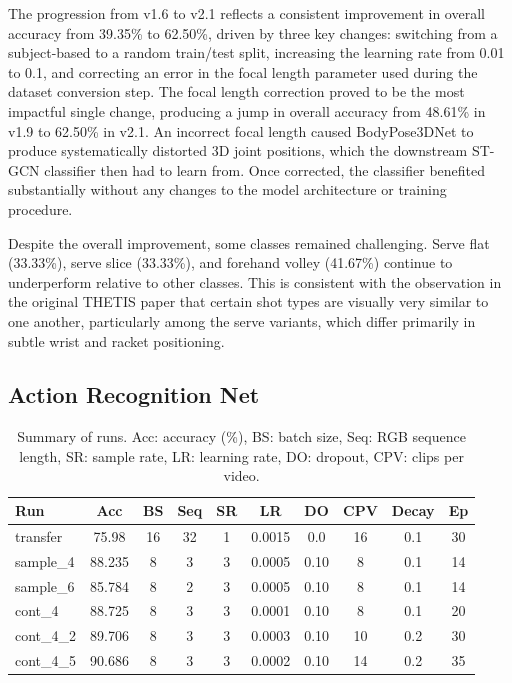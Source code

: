 \documentclass[pdflatex,sn-mathphys-num]{sn-jnl}%
\theoremstyle{thmstyleone}%
\theoremstyle{thmstyletwo}%
\theoremstyle{thmstylethree}%
\begin{document}
The progression from v1.6 to v2.1 reflects a consistent improvement in overall accuracy from 39.35\% to 62.50\%, driven by three key changes: switching from a subject-based to a random train/test split, increasing the learning rate from 0.01 to 0.1, and correcting an error in the focal length parameter used during the dataset conversion step. The focal length correction proved to be the most impactful single change, producing a jump in overall accuracy from 48.61\% in v1.9 to 62.50\% in v2.1. An incorrect focal length caused BodyPose3DNet to produce systematically distorted 3D joint positions, which the downstream ST-GCN classifier then had to learn from. Once corrected, the classifier benefited substantially without any changes to the model architecture or training procedure.

Despite the overall improvement, some classes remained challenging. Serve flat (33.33\%), serve slice (33.33\%), and forehand volley (41.67\%) continue to underperform relative to other classes. This is consistent with the observation in the original THETIS paper \cite{thetis} that certain shot types are visually very similar to one another, particularly among the serve variants, which differ primarily in subtle wrist and racket positioning.

\subsection{Action Recognition Net}\label{subsec1}

\begin{table}[t]
\centering
\setlength{\tabcolsep}{7pt}
\begin{tabular}{lccccccccc}
\toprule
Run & Acc & BS & Seq & SR & LR & DO & CPV & Decay & Ep \\
\midrule
transfer & 75.98 & 16 & 32 & 1 & 0.0015 & 0.0 & 16 & 0.1 & 30 \\

sample\_4 & 88.235 & 8 & 3 & 3 & 0.0005 & 0.10 & 8 & 0.1 & 14 \\

sample\_6 & 85.784 & 8 & 2 & 3 & 0.0005 & 0.10 & 8 & 0.1 & 14 \\

cont\_4 & 88.725 & 8 & 3 & 3 & 0.0001 & 0.10 & 8 & 0.1 & 20 \\

cont\_4\_2 & 89.706 & 8 & 3 & 3 & 0.0003 & 0.10 & 10 & 0.2 & 30 \\

cont\_4\_5 & 90.686 & 8 & 3 & 3 & 0.0002 & 0.10 & 14 & 0.2 & 35 \\
\bottomrule
\end{tabular}
\caption{Summary of runs. Acc: accuracy (\%), BS: batch size, Seq: RGB sequence length, SR: sample rate, LR: learning rate, DO: dropout, CPV: clips per video.}
\label{tab:results}
\end{table}
\end{document}
